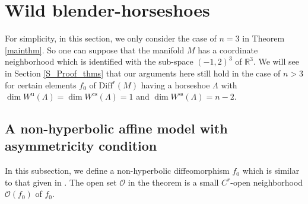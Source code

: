 \documentclass{amsart}
\theoremstyle{definition}
\numberwithin{equation}{section}
\numberwithin{figure}{section}
\begin{document}
\section{Wild blender-horseshoes}\label{S_WBH}

For simplicity, in this section, we only consider the case of $n=3$ in Theorem \ref{mainthm}.
So one can suppose that the manifold $M$ has a coordinate neighborhood which is identified with 
the sub-space $(-1,2)^3$ of $\mathbb{R}^3$.
We will see in Section \ref{S_Proof_thms} that  
our arguments here still hold in the case of $n>3$ 
for certain elements $f_0$ of $\mathrm{Diff}^r(M)$ having a horseshoe 
$\Lambda$ with $\dim W^{\mathrm{u}}(\Lambda)=\dim W^{\mathrm{cs}}(\Lambda)=1$ and $\dim W^{\mathrm{ss}}(\Lambda)=n-2$.



\subsection{A non-hyperbolic affine model with asymmetricity condition}\label{ss_affine_model}


In this subsection, we define a non-hyperbolic diffeomorphism $f_0$ which is similar to that given in \cite{KNS23}.
The open set $\mathcal{O}$ in the theorem is a small $C^r$-open neighborhood $\mathcal{O}(f_0)$ 
of $f_0$.  
\end{document}
